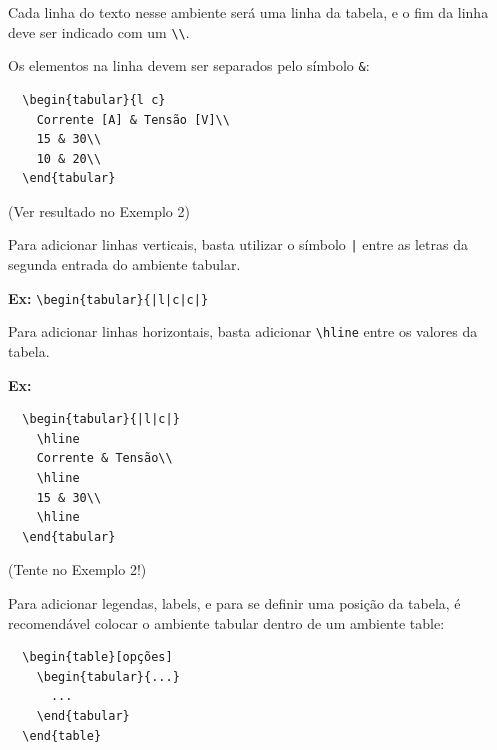 \documentclass[12pt]{beamer}
\begin{document}
\begin{frame}[fragile]
  Cada linha do texto nesse ambiente será uma linha da tabela, e o fim da linha deve ser indicado com um \verb+\\+.

  Os elementos na linha devem ser separados pelo símbolo \verb+&+:
  \begin{verbatim}
  \begin{tabular}{l c}
    Corrente [A] & Tensão [V]\\
    15 & 30\\
    10 & 20\\
  \end{tabular}
  \end{verbatim}

  (Ver resultado no Exemplo 2)
\end{frame}

\begin{frame}[fragile]
  Para adicionar linhas verticais, basta utilizar o símbolo \verb+|+ entre as letras da segunda entrada do ambiente tabular.

  \textbf{Ex:} \verb+\begin{tabular}{|l|c|c|}+

  \medskip

  Para adicionar linhas horizontais, basta adicionar \verb+\hline+ entre os valores da tabela.

  \textbf{Ex:}
  \begin{verbatim}
  \begin{tabular}{|l|c|}
    \hline
    Corrente & Tensão\\
    \hline
    15 & 30\\
    \hline
  \end{tabular}
  \end{verbatim}
  (Tente no Exemplo 2!)
\end{frame}

\begin{frame}[fragile]
  Para adicionar legendas, labels, e para se definir uma posição da tabela, é recomendável colocar o ambiente tabular dentro de um ambiente table:
  \begin{verbatim}
  \begin{table}[opções]
    \begin{tabular}{...}
      ...
    \end{tabular}
  \end{table}
  \end{verbatim}
\end{frame}
\end{document}
